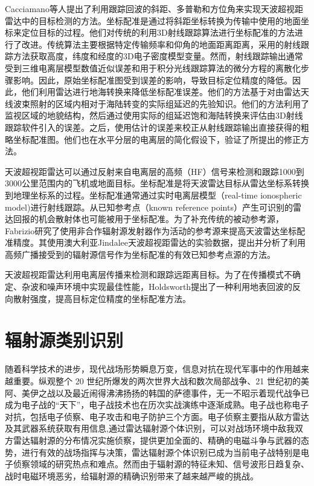 Cacciamano\cite{cacciamano2012coordinate}等人提出了利用跟踪回波的斜距、多普勒和方位角来实现天波超视距雷达中的目标检测的方法。坐标配准是通过将斜距坐标转换为传输中使用的地面坐标来定位目标的过程。他们对传统的利用3D射线跟踪算法进行坐标配准的方法进行了改进。传统算法主要根据特定传输频率和仰角的地面距离距离，采用的射线跟踪方法获取高度，纬度和经度的3D电子密度模型变量。然而，射线跟踪输出通常受到三维电离层模型数值近似误差和用于积分光线跟踪算法的微分方程的离散化步骤影响。因此，原始坐标配准图受到误差的影响，导致目标定位精度的降低。因此，他们利用雷达进行地海转换来降低坐标配准误差。他们的方法基于对由雷达天线波束照射的区域内相对于海陆转变的实际组延迟的先验知识。他们的方法利用了监视区域的地貌结构，然后通过使用实际的组延迟饱和海陆转换来评估由3D射线跟踪软件引入的误差。之后，使用估计的误差来校正从射线跟踪输出直接获得的粗略坐标配准图。他们也在水平分层的电离层的简化假设下，验证了所提出的修正方法。

天波超视距雷达可以通过反射来自电离层的高频（HF）信号来检测和跟踪1000到3000公里范围内的飞机或地面目标。坐标配准是将天波雷达目标从雷达坐标系转换到地理坐标系的过程。坐标配准通常通过实时电离层模型（real-time ionospheric model)进行射线跟踪。从已知参考点（known reference points）产生可识别的雷达回报的机会散射体也可能被用于坐标配准。为了补充传统的被动参考源，Fabrizio\cite{fabrizio2016using}研究了使用非合作辐射源发射器作为活动的参考源来提高天波雷达坐标配准精度。其使用澳大利亚Jindalee天波超视距雷达的实验数据，提出并分析了利用高频广播接受到的辐射源信号作为坐标配准的有效已知参考点源的方法。

天波超视距雷达利用电离层传播来检测和跟踪远距离目标。为了在传播模式不确定、杂波和噪声环境中实现最佳性能，Holdsworth\cite{holdsworth2017skywave}提出了一种利用地表回波的反向散射强度，提高目标定位精度的坐标配准方法。
\section{辐射源类别识别}
随着科学技术的进步，现代战场形势瞬息万变，信息对抗在现代军事中的作用越来越重要。纵观整个 20 世纪所爆发的两次世界大战和数次局部战争、21 世纪初的美阿、美伊之战以及最近闹得沸沸扬扬的韩国的萨德事件，无一不昭示着现代战争已成为电子战的“天下”，电子战技术也在历次实战演练中逐渐成熟。电子战也称电子对抗，包括电子侦察、电子攻击和电子防护三个方面。电子侦察主要指从敌方雷达及其武器系统获取有用信息,通过雷达辐射源个体识别，可以对战场环境中敌我双方雷达辐射源的分布情况实施侦察，提供更加全面的、精确的电磁斗争与武器的态势，进行有效的战场指挥与决策，雷达辐射源个体识别已成为当前电子战特别是电子侦察领域的研究热点和难点\cite{matuszewski2008specific}。然而由于辐射源的特征未知、信号波形日趋复杂、战时电磁环境恶劣，给辐射源的精确识别带来了越来越严峻的挑战。


